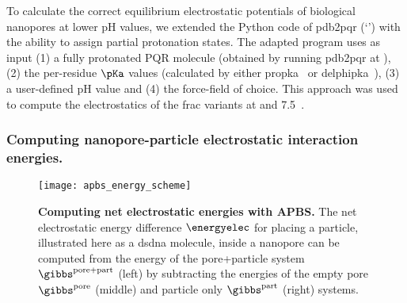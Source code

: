 To calculate the correct equilibrium electrostatic potentials of biological nanopores at lower pH values, we
extended the Python code of \gls{pdb2pqr} (`') with the ability to assign partial
protonation states. The adapted program uses as input (1) a fully protonated PQR molecule (obtained by running
\gls{pdb2pqr} at ), (2) the per-residue $\pKa$ values (calculated by either
\gls{propka}~\cite{Olsson-2011} or \gls{delphipka}~\cite{Wang-2015}), (3) a user-defined pH value and (4) the
force-field of choice. This approach was used to compute the electrostatics of the \gls{frac} variants at
 and \num{7.5}~\cite{Huang-2017}.
%



\subsubsection{Computing nanopore-particle electrostatic interaction energies.}
%
\label{sec:elec:methods:elec:energy}
%

%
\begin{figure*}[b]
  \centering
  \medskip
  \texttt{[image: apbs\_energy\_scheme]}

\caption[Computing net electrostatic energies with {APBS}]{%
  \textbf{Computing net electrostatic energies with {APBS}.}
  The net electrostatic energy difference $\energyelec$ for placing a particle, illustrated here as a
  \gls{dsdna} molecule, inside a nanopore can be computed from the energy of the pore+particle system
  $\gibbs^{\rm{pore+part}}$ (left) by subtracting the energies of the empty pore $\gibbs^{\rm{pore}}$
  (middle) and particle only $\gibbs^{\rm{part}}$ (right) systems.
  }\label{fig:apbs_energy_scheme}
\end{figure*}
%



